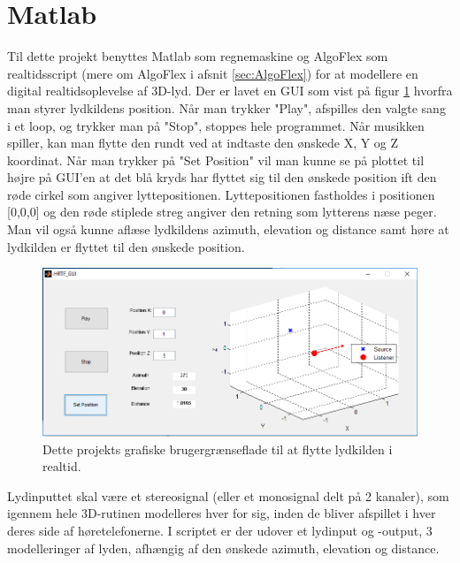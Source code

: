 \section{Matlab}
Til dette projekt benyttes Matlab som regnemaskine og AlgoFlex som realtidsscript (mere om AlgoFlex i afsnit \ref{sec:AlgoFlex}) for at modellere en digital realtidsoplevelse af 3D-lyd. Der er lavet en GUI som vist på figur \ref{fig:gui} hvorfra man styrer lydkildens position. Når man trykker "Play", afspilles den valgte sang i et loop, og trykker man på "Stop", stoppes hele programmet. Når musikken spiller, kan man flytte den rundt ved at indtaste den ønskede X, Y og Z koordinat. Når man trykker på "Set Position" vil man kunne se på plottet til højre på GUI'en at det blå kryds har flyttet sig til den ønskede position ift den røde cirkel som angiver lyttepositionen. Lyttepositionen fastholdes i positionen [0,0,0] og den røde stiplede streg angiver den retning som lytterens næse peger. Man vil også kunne aflæse lydkildens azimuth, elevation og distance samt høre at lydkilden er flyttet til den ønskede position. 

\begin{figure}
	\centering
	\includegraphics[width=1\linewidth]{All_Pics/GUI}
	\caption{Dette projekts grafiske brugergrænseflade til at flytte lydkilden i realtid.}
	\label{fig:gui}
\end{figure}


Lydinputtet skal være et stereosignal (eller et monosignal delt på 2 kanaler), som igennem hele 3D-rutinen modelleres hver for sig, inden de bliver afspillet i hver deres side af høretelefonerne. I scriptet er der udover et lydinput og -output, 3 modelleringer af lyden, afhængig af den ønskede azimuth, elevation og distance. 

